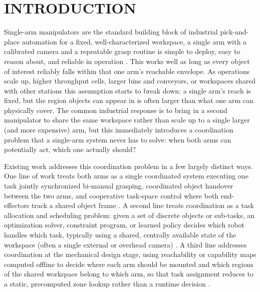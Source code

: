 \documentclass[letterpaper, 10 pt, conference]{ieeeconf}  %
\begin{document}
\section{INTRODUCTION}
Single-arm manipulators are the standard building block of industrial pick-and-place automation for a fixed, well-characterized workspace, a single arm with a calibrated camera and a repeatable grasp routine is simple to deploy, easy to reason about, and
reliable in operation \cite{shukla2024automated}. This works well as long as every object of interest reliably
falls within that one arm's reachable envelope. As operations scale up, higher throughput cells, larger bins and conveyors, or workspaces shared with other stations this assumption starts to break down: a single arm's reach is fixed, but the region objects can appear in is often larger than what one arm can physically cover. The common industrial response is to bring in a second manipulator to share the same workspace rather than scale up to a single larger (and more expensive) arm, but this immediately introduces a coordination problem \cite{prajapati2025kinematics} that a single-arm system never has to solve: when both arms can potentially act, which one actually should?

Existing work addresses this coordination problem in a few largely distinct ways. One line of work treats both arms as a single coordinated system executing one task jointly synchronized bi-manual grasping, coordinated object handover between the two arms, and cooperative task-space control where both end-effectors track a shared object frame \cite{smith2012dual}. A second line treats coordination as a task allocation and scheduling problem: given a set of discrete objects or sub-tasks, an optimization solver, constraint program, or learned policy decides which robot handles which task, typically using a shared, centrally available state of the workspace (often a single external or overhead camera) \cite{behrens2019constraint, jermann2024efficient}. A third line addresses coordination at the mechanical design stage, using reachability or capability maps computed offline to decide where each arm should be mounted and which regions of the shared workspace belong to which arm, so that task assignment reduces to a static, precomputed zone lookup rather than a runtime decision \cite{zacharias2007capturing}. 
\end{document}
